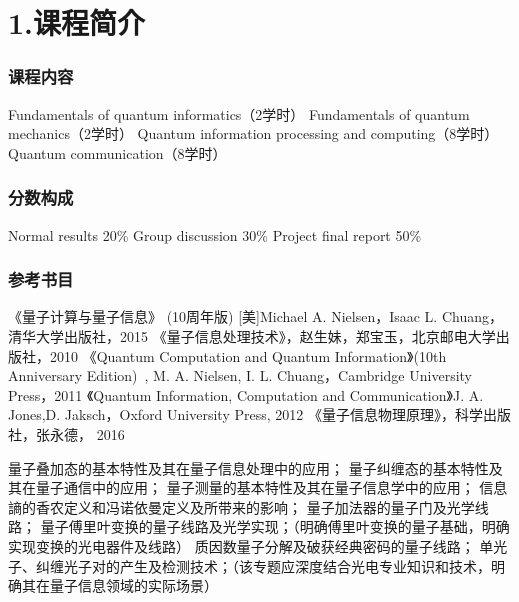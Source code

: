 
\section{1.课程简介}

\begin{frame}
    \frametitle{课程内容}
        \begin{enumerate}
            \Item Fundamentals of quantum informatics（2学时）
            \IItem Fundamentals of quantum mechanics（2学时）
            \Item Quantum information processing and computing（8学时）
            \Item Quantum communication（8学时）
        \end{enumerate}
\end{frame}
\begin{frame} 
    \frametitle{分数构成}
        \begin{enumerate}
            \Item Normal results 20\%
            \Item Group discussion 30\%
            \Item Project final report 50\%
        \end{enumerate}
\end{frame}

\begin{frame}
    \frametitle{参考书目}
        \begin{itemize}
            \Item 《量子计算与量子信息》 (10周年版)  [美]Michael A. Nielsen，Isaac L. Chuang，清华大学出版社，2015        
            \Item 《量子信息处理技术》，赵生妹，郑宝玉，北京邮电大学出版社，2010
            \Item 《Quantum Computation and Quantum Information》(10th Anniversary Edition) , M. A. Nielsen, I. L. Chuang，Cambridge University Press，2011
            \Item 《Quantum Information, Computation and Communication》J. A. Jones,D. Jaksch，Oxford  University Press, 2012
            \Item 《量子信息物理原理》，科学出版社，张永德，   2016
        \end{itemize}
\end{frame}

\begin{frame}
    \begin{tcolorbox4}[分组讨论及报告专题设置(1)]    
        \begin{enumerate}
            \Item  量子叠加态的基本特性及其在量子信息处理中的应用；
            \Item  量子纠缠态的基本特性及其在量子通信中的应用；
            \Item  量子测量的基本特性及其在量子信息学中的应用；
            \Item  信息謪的香农定义和冯诺依曼定义及所带来的影响；
            \Item  量子加法器的量子门及光学线路；
            \Item  量子傅里叶变换的量子线路及光学实现；（明确傅里叶变换的量子基础，明确实现变换的光电器件及线路）
            \Item  质因数量子分解及破获经典密码的量子线路； 
            \Item   单光子、纠缠光子对的产生及检测技术；（该专题应深度结合光电专业知识和技术，明确其在量子信息领域的实际场景） 
        \end{enumerate}
    \end{tcolorbox4} 
\end{frame}

